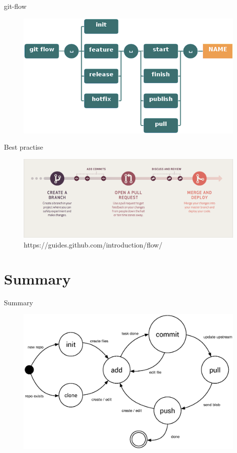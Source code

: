 \documentclass{beamer}
\begin{document}
\begin{frame}{git-flow}
    \begin{figure}
        \center
        \includegraphics[width=.9\textwidth]{git-flow-commands}
        \label{fig:git-flow-commands}
    \end{figure}
\end{frame}

\begin{frame}{Best practise}
    \begin{figure}
        \center
        \includegraphics[width=.9\textwidth]{git-workflow}
        \caption{https://guides.github.com/introduction/flow/}
        \label{fig:git-workflow}
    \end{figure}
\end{frame}

\section{Summary}
\begin{frame}{Summary}
    \begin{figure}
        \includegraphics[width=.9\textwidth]{git-command-flow}
        \label{fig:git-command-flow-x}
    \end{figure}
\end{frame}
\end{document}
